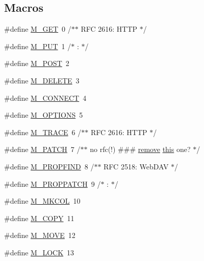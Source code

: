 \subsection*{Macros}
\begin{DoxyCompactItemize}
\item 
\#define \hyperlink{group__Methods_ga8793a8633545688a32ef097e9b0ac591}{M\+\_\+\+G\+ET}~0       /$\ast$$\ast$ R\+FC 2616\+: H\+T\+TP $\ast$/
\item 
\#define \hyperlink{group__Methods_ga15fe80957b13b098510092b1f10644d2}{M\+\_\+\+P\+UT}~1       /$\ast$  \+:             $\ast$/
\item 
\#define \hyperlink{group__Methods_ga7d031dd0f1b93bb8f535e2afaa22c9d7}{M\+\_\+\+P\+O\+ST}~2
\item 
\#define \hyperlink{group__Methods_gabe01af175a6e782872b5e7dd1567df24}{M\+\_\+\+D\+E\+L\+E\+TE}~3
\item 
\#define \hyperlink{group__Methods_ga4106bb987c2d4796a6c22646646c5c1b}{M\+\_\+\+C\+O\+N\+N\+E\+CT}~4
\item 
\#define \hyperlink{group__Methods_ga24915023381727825ec05bd5a83f9743}{M\+\_\+\+O\+P\+T\+I\+O\+NS}~5
\item 
\#define \hyperlink{group__Methods_ga7b43164abfdf24a3ef4cbcee7622551d}{M\+\_\+\+T\+R\+A\+CE}~6       /$\ast$$\ast$ R\+FC 2616\+: H\+T\+TP $\ast$/
\item 
\#define \hyperlink{group__Methods_ga078bdec5bbf4fdd33c594de044b06639}{M\+\_\+\+P\+A\+T\+CH}~7       /$\ast$$\ast$ no rfc(!)  \#\#\# \hyperlink{group__APACHE__CORE__COOKIE_ga7ebb94e118f56a4baf4bfe9cc313cf1d}{remove} \hyperlink{pcregrep_8txt_a1d4586f0a85ecec85237e5fb0f611dd1}{this} one? $\ast$/
\item 
\#define \hyperlink{group__Methods_ga68b6e538fbfecc59ee181d7794bb1ee0}{M\+\_\+\+P\+R\+O\+P\+F\+I\+ND}~8       /$\ast$$\ast$ R\+FC 2518\+: Web\+D\+AV $\ast$/
\item 
\#define \hyperlink{group__Methods_ga859db5148545953d1addb1a6137bf052}{M\+\_\+\+P\+R\+O\+P\+P\+A\+T\+CH}~9       /$\ast$  \+:               $\ast$/
\item 
\#define \hyperlink{group__Methods_gadfb4d527a8bc53d86fbb19275273ae2a}{M\+\_\+\+M\+K\+C\+OL}~10
\item 
\#define \hyperlink{group__Methods_ga928e39b0bef81fe16e1b92c3c9611575}{M\+\_\+\+C\+O\+PY}~11
\item 
\#define \hyperlink{group__Methods_ga6a2140ff5ae54ee6344f95f9bd22cf90}{M\+\_\+\+M\+O\+VE}~12
\item 
\#define \hyperlink{group__Methods_ga1e83c5bf3f02b16a4782782273dd12b0}{M\+\_\+\+L\+O\+CK}~13

\end{DoxyCompactItemize}
